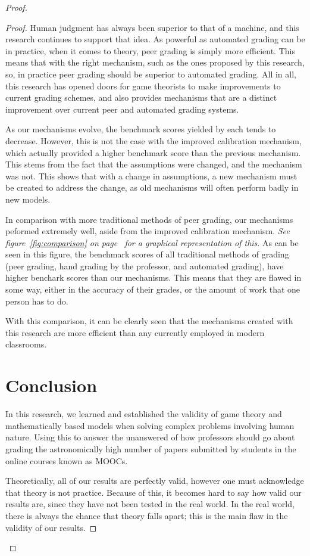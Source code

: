 \documentclass[12pt, Arial]{article}
\begin{document}
\begin{proof}
\begin{proof}
Human judgment has always been superior to that of a machine, and this research continues to support that idea. As powerful as automated grading can be in practice, when it comes to theory, peer grading is simply more efficient. This means that with the right mechanism, such as the ones proposed by this research, so, in practice peer grading should be superior to automated grading. All in all, this research has opened doors for game theorists to make improvements to current grading schemes, and also provides mechanisms that are a distinct improvement over current peer and automated grading systems.

As our mechanisms evolve, the benchmark scores yielded by each tends to decrease. However, this is not the case with the improved calibration mechanism, which actually provided a higher benchmark score than the previous mechanism. This stems from the fact that the assumptions were changed, and the mechanism was not. This shows that with a change in assumptions, a new mechanism must be created to address the change, as old mechanisms will often perform badly in new models.

In comparison with more traditional methods of peer grading, our mechanisms peformed extremely well, aside from the improved calibration mechanism. \emph{See figure~\ref{fig:comparison} on page~\pageref{fig:comparison} for a graphical representation of this}. As can be seen in this figure, the benchmark scores of all traditional methods of grading (peer grading, hand grading by the professor, and automated grading), have higher benchark scores than our mechanisms. This means that they are flawed in some way, either in the accuracy of their grades, or the amount of work that one person has to do.

With this comparison, it can be clearly seen that the mechanisms created with this research are more efficient than any currently employed in modern classrooms.

\section{Conclusion}
In this research, we learned and established the validity of game theory and mathematically based models when solving complex problems involving human nature. Using this to answer the unanswered of how professors should go about grading the astronomically high number of papers submitted by students in the online courses known as MOOCs.

Theoretically, all of our results are perfectly valid, however one must acknowledge that theory is not practice. Because of this, it becomes hard to say how valid our results are, since they have not been tested in the real world. In the real world, there is always the chance that theory falls apart; this is the main flaw in the validity of our results.


\end{proof}
\end{proof}
\end{document}
